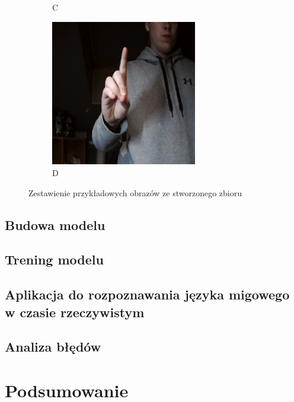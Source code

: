 \documentclass[a4paper,12pt,oneside]{book} %
\begin{document}
\begin{figure}[h]
\begin{subfigure}{0.4\textwidth}
			\caption{C}
		\end{subfigure}
		\begin{subfigure}{0.4\textwidth}
			\centering
			\includegraphics[width=0.7\textwidth]{asl_d.png}
			\caption{D}
		\end{subfigure}
	\caption{Zestawienie przykładowych obrazów ze stworzonego zbioru}
	\label{asl_own_photos}
\end{figure}

\section{Budowa modelu}
\lipsum[1]

\section{Trening modelu}
\lipsum[1]

\section{Aplikacja do rozpoznawania języka migowego w czasie rzeczywistym}
\lipsum[1]

\section{Analiza błędów}
\lipsum[1]

\chapter{Podsumowanie}
\lipsum[1]
\lipsum[1]

\listoftables{} %

\listoffigures{} %

\lstlistoflistings
{}



\end{document}
